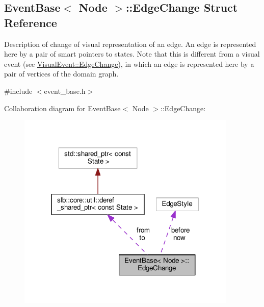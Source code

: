 \hypertarget{structEventBase_1_1EdgeChange}{}\subsection{Event\+Base$<$ Node $>$\+:\+:Edge\+Change Struct Reference}
\label{structEventBase_1_1EdgeChange}


Description of change of visual representation of an edge. An edge is represented here by a pair of smart pointers to states. Note that this is different from a visual event (see \hyperlink{structVisualEvent_1_1EdgeChange}{Visual\+Event\+::\+Edge\+Change}), in which an edge is represented here by a pair of vertices of the domain graph.  




{\ttfamily \#include $<$event\+\_\+base.\+h$>$}



Collaboration diagram for Event\+Base$<$ Node $>$\+:\+:Edge\+Change\+:\nopagebreak
\begin{figure}[H]
\begin{center}
\leavevmode
\includegraphics[width=296pt]{structEventBase_1_1EdgeChange__coll__graph}
\end{center}
\end{figure}
